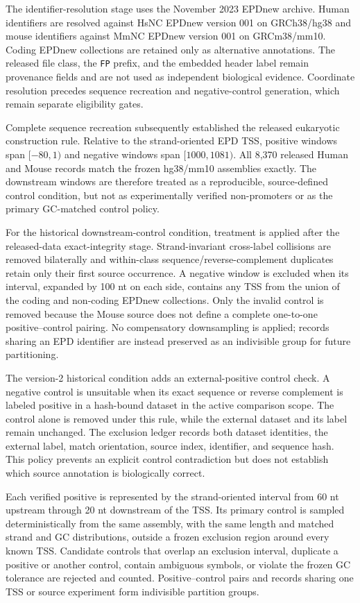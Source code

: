 The identifier-resolution stage uses the November 2023 EPDnew archive. Human
identifiers are resolved against HsNC EPDnew version 001 on GRCh38/hg38 and
mouse identifiers against MmNC EPDnew version 001 on GRCm38/mm10. Coding EPDnew
collections are retained only as alternative annotations. The released file
class, the \texttt{FP} prefix, and the embedded header label remain provenance
fields and are not used as independent biological evidence. Coordinate
resolution precedes sequence recreation and negative-control generation, which
remain separate eligibility gates.

Complete sequence recreation subsequently established the released eukaryotic
construction rule. Relative to the strand-oriented EPD TSS, positive windows
span $[-80,1)$ and negative windows span $[1000,1081)$. All 8,370 released
Human and Mouse records match the frozen hg38/mm10 assemblies exactly. The
downstream windows are therefore treated as a reproducible, source-defined
control condition, but not as experimentally verified non-promoters or as the
primary GC-matched control policy.

For the historical downstream-control condition, treatment is applied after
the released-data exact-integrity stage. Strand-invariant cross-label
collisions are removed bilaterally and within-class sequence/reverse-complement
duplicates retain only their first source occurrence. A negative window is
excluded when its interval, expanded by 100 nt on each side, contains any TSS
from the union of the coding and non-coding EPDnew collections. Only the invalid
control is removed because the Mouse source does not define a complete
one-to-one positive--control pairing. No compensatory downsampling is applied;
records sharing an EPD identifier are instead preserved as an indivisible group
for future partitioning.

The version-2 historical condition adds an external-positive control check. A
negative control is unsuitable when its exact sequence or reverse complement
is labeled positive in a hash-bound dataset in the active comparison scope.
The control alone is removed under this rule, while the external dataset and
its label remain unchanged. The exclusion ledger records both dataset
identities, the external label, match orientation, source index, identifier,
and sequence hash. This policy prevents an explicit control contradiction but
does not establish which source annotation is biologically correct.

Each verified positive is represented by the strand-oriented interval from 60
nt upstream through 20 nt downstream of the TSS. Its primary control is sampled
deterministically from the same assembly, with the same length and matched
strand and GC distributions, outside a frozen exclusion region around every
known TSS. Candidate controls that overlap an exclusion interval, duplicate a
positive or another control, contain ambiguous symbols, or violate the frozen
GC tolerance are rejected and counted. Positive--control pairs and records
sharing one TSS or source experiment form indivisible partition groups.


